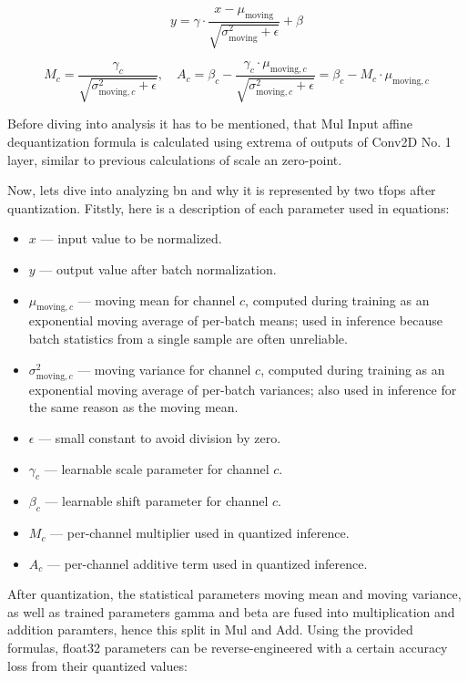 {\begin{equation}
y = \gamma \cdot \frac{x - \mu_{\text{moving}}}{\sqrt{\sigma^2_{\text{moving}} + \epsilon}} + \beta
\label{eq:bn}
\end{equation}

\begin{equation}
M_c = \frac{\gamma_c}{\sqrt{\sigma^2_{\text{moving},c} + \epsilon}}, 
\quad
A_c = \beta_c - \frac{\gamma_c \cdot \mu_{\text{moving},c}}{\sqrt{\sigma^2_{\text{moving},c} + \epsilon}}
      = \beta_c - M_c \cdot \mu_{\text{moving},c}
\label{eq:bnquant}
\end{equation}

Before diving into analysis it has to be mentioned,
that Mul Input affine dequantization formula is calculated using extrema of outputs of Conv2D No. 1 layer,
similar to previous calculations of scale an zero-point.

Now, lets dive into analyzing \gls{bn} and why it is represented by two \glspl{tfop} after quantization.
Fitstly, here is a description of each parameter used in equations:

\begin{itemize}
    \item $x$ — input value to be normalized.
    \item $y$ — output value after batch normalization.
    \item $\mu_{\text{moving},c}$ — moving mean for channel $c$, computed during training as an exponential moving average of per-batch means; used in inference because batch statistics from a single sample are often unreliable.
    \item $\sigma^2_{\text{moving},c}$ — moving variance for channel $c$, computed during training as an exponential moving average of per-batch variances; also used in inference for the same reason as the moving mean.
    \item $\epsilon$ — small constant to avoid division by zero.
    \item $\gamma_c$ — learnable scale parameter for channel $c$.
    \item $\beta_c$ — learnable shift parameter for channel $c$.
    \item $M_c$ — per-channel multiplier used in quantized inference.
    \item $A_c$ — per-channel additive term used in quantized inference.
\end{itemize}

After quantization, the statistical parameters moving mean and moving variance, as well as trained parameters gamma and beta are fused into multiplication and addition paramters,
hence this split in Mul and Add. Using the provided formulas, \gls{float32} parameters can be reverse-engineered with a certain accuracy loss from their quantized values:

}
